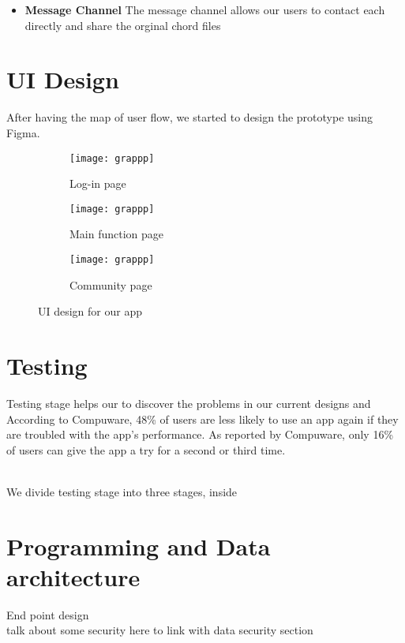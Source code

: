 \begin{itemize}
\item \textbf{Message Channel}
The message channel allows our users to contact each directly and share the orginal chord files 

\end{itemize}




\section{UI Design}
After having the map of user flow, we started to design the prototype using Figma.

\begin{figure}[ht]
     \centering
     \hspace{16mm}
     \begin{subfigure}[b]{0.2\textwidth}
         \centering
         \texttt{[image: grappp]}
         \caption{Log-in page}
         \label{Log-in page}
     \end{subfigure}
     \hfill
     \begin{subfigure}[b]{0.2\textwidth}
         \centering
         \texttt{[image: grappp]}
         \caption{Main function page}
         \label{Main function page}
     \end{subfigure}
     \hfill
     \begin{subfigure}[b]{0.2\textwidth}
         \centering
         \texttt{[image: grappp]}
         \caption{Community page}
         \label{Community page}
     \end{subfigure}
     \hspace{16mm}
        \caption{UI design for our app}
        \label{fig:three graphs}
\end{figure}

\section{Testing}
Testing stage helps our to discover the problems in our current designs and 
According to Compuware, 48\% of users are less likely to use an app again if they are troubled with the app’s performance.
As reported by Compuware, only 16\% of users can give the app a try for a second or third time. 

\\We divide testing stage into three stages, inside 

\section{Programming and Data architecture}
End point design
\\talk about some security here to link with data security section






